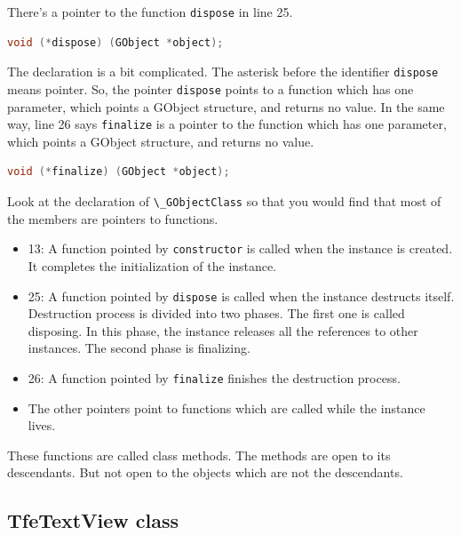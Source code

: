 There's a pointer to the function \passthrough{\lstinline!dispose!} in
line 25.

\begin{lstlisting}[language=C]
void (*dispose) (GObject *object);
\end{lstlisting}

The declaration is a bit complicated. The asterisk before the identifier
\passthrough{\lstinline!dispose!} means pointer. So, the pointer
\passthrough{\lstinline!dispose!} points to a function which has one
parameter, which points a GObject structure, and returns no value. In
the same way, line 26 says \passthrough{\lstinline!finalize!} is a
pointer to the function which has one parameter, which points a GObject
structure, and returns no value.

\begin{lstlisting}[language=C]
void (*finalize) (GObject *object);
\end{lstlisting}

Look at the declaration of \passthrough{\lstinline!\_GObjectClass!} so
that you would find that most of the members are pointers to functions.

\begin{itemize}
\tightlist
\item
  13: A function pointed by \passthrough{\lstinline!constructor!} is
  called when the instance is created. It completes the initialization
  of the instance.
\item
  25: A function pointed by \passthrough{\lstinline!dispose!} is called
  when the instance destructs itself. Destruction process is divided
  into two phases. The first one is called disposing. In this phase, the
  instance releases all the references to other instances. The second
  phase is finalizing.
\item
  26: A function pointed by \passthrough{\lstinline!finalize!} finishes
  the destruction process.
\item
  The other pointers point to functions which are called while the
  instance lives.
\end{itemize}

These functions are called class methods. The methods are open to its
descendants. But not open to the objects which are not the descendants.

\subsection{TfeTextView class}\label{tfetextview-class}

